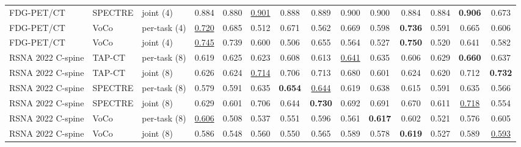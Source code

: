 \begin{tabular}{lllccccccccccc}
FDG-PET/CT & SPECTRE & joint (4) & \cellcolor{modebest}0.884 & \cellcolor{modebest}0.880 & \cellcolor{modebest}\underline{0.901} & \cellcolor{modebest}0.888 & \cellcolor{modebest}0.889 & \cellcolor{modebest}0.900 & \cellcolor{modebest}0.900 & 0.884 & \cellcolor{modebest}0.884 & \cellcolor{modebest}\textbf{0.906} & \cellcolor{modebest}0.673 \\
\addlinespace[2pt]
FDG-PET/CT & VoCo & per-task (4) & \underline{0.720} & 0.685 & 0.512 & \cellcolor{modebest}0.671 & 0.562 & \cellcolor{modebest}0.669 & \cellcolor{modebest}0.598 & \textbf{0.736} & \cellcolor{modebest}0.591 & \cellcolor{modebest}0.665 & \cellcolor{modebest}0.606 \\
FDG-PET/CT & VoCo & joint (4) & \cellcolor{modebest}\underline{0.745} & \cellcolor{modebest}0.739 & \cellcolor{modebest}0.600 & 0.506 & \cellcolor{modebest}0.655 & 0.564 & 0.527 & \cellcolor{modebest}\textbf{0.750} & 0.520 & 0.641 & 0.582 \\
\addlinespace[2pt]
RSNA 2022 C-spine & TAP-CT & per-task (8) & 0.619 & \cellcolor{modebest}0.625 & 0.623 & 0.608 & 0.613 & \underline{0.641} & \cellcolor{modebest}0.635 & 0.606 & \cellcolor{modebest}0.629 & \textbf{0.660} & 0.637 \\
RSNA 2022 C-spine & TAP-CT & joint (8) & \cellcolor{modebest}0.626 & 0.624 & \cellcolor{modebest}\underline{0.714} & \cellcolor{modebest}0.706 & \cellcolor{modebest}0.713 & \cellcolor{modebest}0.680 & 0.601 & \cellcolor{modebest}0.624 & 0.620 & \cellcolor{modebest}0.712 & \cellcolor{modebest}\textbf{0.732} \\
\addlinespace[2pt]
RSNA 2022 C-spine & SPECTRE & per-task (8) & 0.579 & 0.591 & 0.635 & \cellcolor{modebest}\textbf{0.654} & \underline{0.644} & 0.619 & 0.638 & 0.615 & 0.591 & 0.635 & \cellcolor{modebest}0.566 \\
RSNA 2022 C-spine & SPECTRE & joint (8) & \cellcolor{modebest}0.629 & \cellcolor{modebest}0.601 & \cellcolor{modebest}0.706 & 0.644 & \cellcolor{modebest}\textbf{0.730} & \cellcolor{modebest}0.692 & \cellcolor{modebest}0.691 & \cellcolor{modebest}0.670 & \cellcolor{modebest}0.611 & \cellcolor{modebest}\underline{0.718} & 0.554 \\
\addlinespace[2pt]
RSNA 2022 C-spine & VoCo & per-task (8) & \cellcolor{modebest}\underline{0.606} & 0.508 & 0.537 & \cellcolor{modebest}0.551 & \cellcolor{modebest}0.596 & 0.561 & \cellcolor{modebest}\textbf{0.617} & 0.602 & 0.521 & 0.576 & \cellcolor{modebest}0.605 \\
RSNA 2022 C-spine & VoCo & joint (8) & 0.586 & \cellcolor{modebest}0.548 & \cellcolor{modebest}0.560 & 0.550 & 0.565 & \cellcolor{modebest}0.589 & 0.578 & \cellcolor{modebest}\textbf{0.619} & \cellcolor{modebest}0.527 & \cellcolor{modebest}0.589 & \underline{0.593} \\

\end{tabular}
